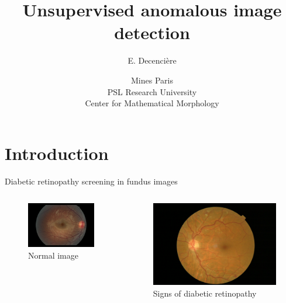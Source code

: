 \documentclass[xcolor=pdftex,dvipsnames,table,mathserif,aspectratio=169]{beamer}
\title{Unsupervised anomalous image detection}
\author{E. Decencière}
\date{Mines Paris\\
  PSL Research University\\
  Center for Mathematical Morphology
}
\begin{document}
\frame{\titlepage}


\section{Introduction}

\begin{frame}{Diabetic retinopathy screening in fundus images}

  \begin{columns}
    \begin{column}{.5\textwidth}
  \begin{figure}[ht]
    \centering
    \includegraphics[width=\textwidth]{fundus1}
    \caption*{Normal image}
  \end{figure}

    \end{column}

    \begin{column}{.5\textwidth}

\begin{figure}[ht]
  \centering
  \includegraphics[width=\textwidth]{ret-dr}
  \caption*{Signs of diabetic retinopathy}
\end{figure}



\end{column}
\end{columns}
\end{frame}
\end{document}
